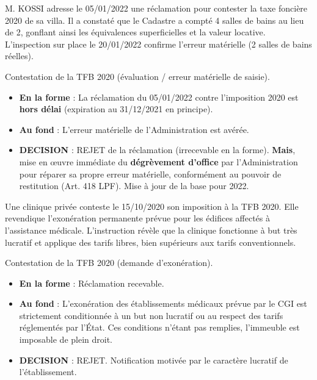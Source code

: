 \documentclass[a4paper, 11pt]{exam}
\begin{document}
\begin{questions}
		\question M. KOSSI adresse le 05/01/2022 une réclamation pour contester la taxe foncière 2020 de sa villa. Il a constaté que le Cadastre a compté 4 salles de bains au lieu de 2, gonflant ainsi les équivalences superficielles et la valeur locative. L'inspection sur place le 20/01/2022 confirme l'erreur matérielle (2 salles de bains réelles).
		\begin{solution}
			Contestation de la TFB 2020 (évaluation / erreur matérielle de saisie).
			\begin{itemize}
				\item \textbf{En la forme} : La réclamation du 05/01/2022 contre l'imposition 2020 est \textbf{hors délai} (expiration au 31/12/2021 en principe).
				\item \textbf{Au fond} : L'erreur matérielle de l'Administration est avérée.
				\item \textbf{DECISION} : REJET de la réclamation (irrecevable en la forme). \textbf{Mais}, mise en œuvre immédiate du \textbf{dégrèvement d'office} par l'Administration pour réparer sa propre erreur matérielle, conformément au pouvoir de restitution (Art. 418 LPF). Mise à jour de la base pour 2022.
			\end{itemize}
		\end{solution}
		
		\question Une clinique privée conteste le 15/10/2020 son imposition à la TFB 2020. Elle revendique l'exonération permanente prévue pour les édifices affectés à l'assistance médicale. L'instruction révèle que la clinique fonctionne à but très lucratif et applique des tarifs libres, bien supérieurs aux tarifs conventionnels.
		\begin{solution}
			Contestation de la TFB 2020 (demande d'exonération).
			\begin{itemize}
				\item \textbf{En la forme} : Réclamation recevable.
				\item \textbf{Au fond} : L'exonération des établissements médicaux prévue par le CGI est strictement conditionnée à un but non lucratif ou au respect des tarifs réglementés par l'État. Ces conditions n'étant pas remplies, l'immeuble est imposable de plein droit.
				\item \textbf{DECISION} : REJET. Notification motivée par le caractère lucratif de l'établissement.
			\end{itemize}
		\end{solution}
		

\end{questions}
\end{document}
